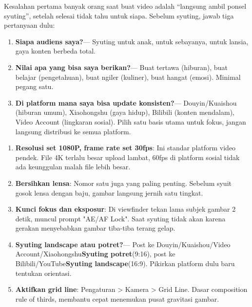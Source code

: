 


Kesalahan pertama banyak orang saat buat video adalah “langsung ambil ponsel syuting”, setelah selesai tidak tahu untuk siapa. Sebelum syuting, jawab tiga pertanyaan dulu:

\begin{enumerate}
  \item \textbf{Siapa audiens saya?}— Syuting untuk anak, untuk sebayanya, untuk lansia, gaya konten berbeda total.
  \item \textbf{Nilai apa yang bisa saya berikan?}— Buat tertawa (hiburan), buat belajar (pengetahuan), buat ngiler (kuliner), buat hangat (emosi). Minimal pegang satu.
  \item \textbf{Di platform mana saya bisa update konsisten?}— Douyin/Kuaishou (hiburan umum), Xiaohongshu (gaya hidup), Bilibili (konten mendalam), Video Account (lingkaran sosial). Pilih satu basis utama untuk fokus, jangan langsung distribusi ke semua platform.
\end{enumerate}


\begin{enumerate}
  \item \textbf{Resolusi set 1080P, frame rate set 30fps}: Ini standar platform video pendek. File 4K terlalu besar upload lambat, 60fps di platform sosial tidak ada keunggulan malah file lebih besar.
  \item \textbf{Bersihkan lensa}: Nomor satu juga yang paling penting. Sebelum syuit gosok lensa dengan baju, gambar langsung jernih satu tingkat.
  \item \textbf{Kunci fokus dan eksposur}: Di viewfinder tekan lama subjek gambar 2 detik, muncul prompt "AE/AF Lock". Saat syuting tidak akan karena gerakan menyebabkan gambar tiba-tiba terang gelap.
  \item \textbf{Syuting landscape atau potret?}— Post ke Douyin/Kuaishou/Video Account/Xiaohongshu\textbf{Syuting potret}(9:16), post ke Bilibili/YouTube\textbf{Syuting landscape}(16:9). Pikirkan platform dulu baru tentukan orientasi.
  \item \textbf{Aktifkan grid line}: Pengaturan > Kamera > Grid Line. Dasar composition rule of thirds, membantu cepat menemukan pusat gravitasi gambar.
\end{enumerate}

